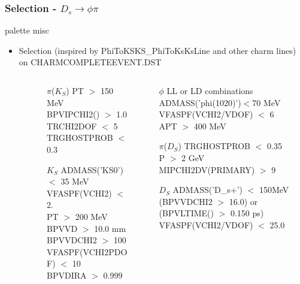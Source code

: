 \documentclass{beamer}
\begin{document}
\LogoOff
\begin{frame}[fragile]
\frametitle{Selection - $D_s \rightarrow \phi \pi$}
\vspace*{-2mm}
\begin{beamercolorbox}[rounded=true,shadow=true]{palette misc}
\vspace*{-3mm}
\begin{itemize}
\item Selection (inspired by PhiToKSKS\_PhiToKsKsLine and other charm lines) on CHARMCOMPLETEEVENT.DST

\begin{columns}
\begin{column}{.01\textwidth}
$\frac{}{}$
\end{column}
\begin{column}{.46\textwidth}
\vspace*{-.3mm}
\begin{itemize}
\item[$\pi$($K_S$)]
PT $>$ 150 MeV\\
BPVIPCHI2() $>$ 1.0\\
TRCHI2DOF $<$ 5\\
TRGHOSTPROB $<$ 0.3\\
\item[$K_S$] ADMASS('KS0') $<$ 35 MeV\\
VFASPF(VCHI2) $<$ 2.\\
PT $>$ 200 MeV\\
BPVVD $>$ 10.0 mm\\
BPVVDCHI2 $>$ 100\\
VFASPF(VCHI2PDOF) $<$ 10\\
BPVDIRA $>$ 0.999\\
\end{itemize}


\end{column}
\begin{column}{.48\textwidth}
\begin{itemize}
\item[$\phi$]LL or LD combinations\\
ADMASS('phi(1020)')$<$70 MeV\\
VFASPF(VCHI2/VDOF) $<$ 6\\
APT $>$ 400 MeV\\
\item[$\pi$($D_S$)]TRGHOSTPROB $<$ 0.35\\
P $>$ 2 GeV\\
MIPCHI2DV(PRIMARY) $>$ 9 \\
\item[$D_S$]ADMASS('D\_s+') $<$ 150MeV\\
(BPVVDCHI2 $>$ 16.0) or (BPVLTIME() $>$ 0.150 ps)\\
VFASPF(VCHI2/VDOF) $<$ 25.0\\
\end{itemize}


\end{column}
\end{columns}
\end{itemize}
\end{beamercolorbox}
\end{frame}
\end{document}
